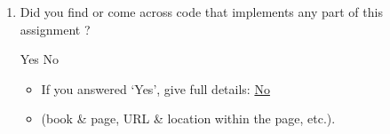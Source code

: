 \documentclass[11pt]{exam}
\numberwithin{equation}{section} %
\numberwithin{figure}{section} %
\numberwithin{table}{section} %
\begin{document}
\begin{enumerate}
    \item Did you find or come across code that implements any part of this assignment ?
          \begin{checkboxes}
              \choice Yes
              \choice No
          \end{checkboxes}
          \begin{itemize}
              \item If you answered `Yes', give full details: \underline{No}
              \item (book \& page, URL \& location within the page, etc.).
          \end{itemize}
          \begin{tcolorbox}[fit,height=3cm,blank, borderline={1pt}{-2pt},nobeforeafter]
          \end{tcolorbox}
\end{enumerate}
\end{document}

